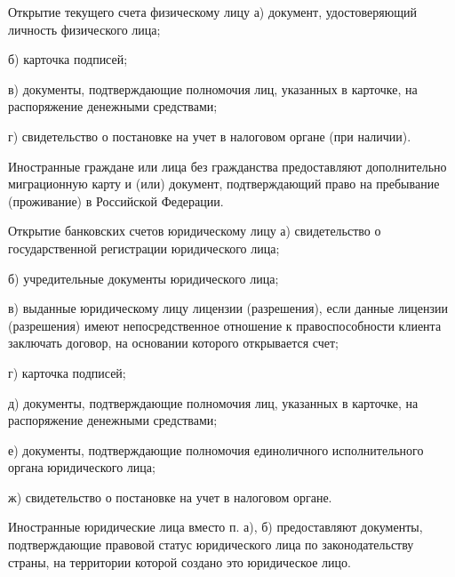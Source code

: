\documentclass[_Banking_p2.tex]{subfiles}
\begin{document}
\begin{frame}{Открытие текущего счета физическому лицу}
а) документ, удостоверяющий личность физического лица;

б) карточка подписей;

в) документы, подтверждающие полномочия лиц, указанных в карточке, на распоряжение денежными средствами;

г) свидетельство о постановке на учет в налоговом органе (при наличии).

Иностранные граждане или лица без гражданства предоставляют дополнительно миграционную карту и (или) документ, подтверждающий право на пребывание (проживание) в Российской Федерации.
\end{frame}

\begin{frame}[allowframebreaks]{Открытие банковских счетов юридическому лицу}
а) свидетельство о государственной регистрации юридического лица;

б) учредительные документы юридического лица;

в) выданные юридическому лицу лицензии (разрешения), если данные лицензии (разрешения) имеют непосредственное отношение к правоспособности клиента заключать договор, на основании которого открывается счет;

г) карточка  подписей;

\pagebreak
д) документы, подтверждающие полномочия лиц, указанных в карточке, на распоряжение денежными средствами;

е) документы, подтверждающие полномочия единоличного исполнительного органа юридического лица;

ж) свидетельство о постановке на учет в налоговом органе.

Иностранные юридические лица вместо п. а), б) предоставляют документы, подтверждающие правовой статус юридического лица по законодательству страны, на территории которой создано это юридическое лицо.

\end{frame}
\end{document}
